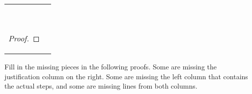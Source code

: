 \begin{exercises}
\begin{longtabu}{X[1.4]X[1]}
\\
\vspace{-1cm}
\item \textcolor{white}{.}  
\vspace{-16pt}
	\begin{proof}
		 
	  
	 
	  
	  
	 
	  
	 
	  
	\end{proof}

\end{longtabu}
\end{exercises}

\noindent\problempart \label{pr.justifySLproof} Fill in the missing pieces in the following proofs. Some are missing the justification column on the right. Some are missing the left column that contains the actual steps, and some are missing lines from both columns.

